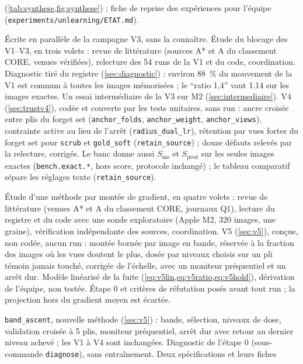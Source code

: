 \documentclass[11pt,a4paper]{article}
\newcommand{\code}[1]{\texttt{#1}}
\newcommand{\chemin}[1]{\nolinkurl{#1}}%
\begin{document}
\begin{description}[leftmargin=1.2em,font=\sffamily\bfseries\color{bleu}]
    (\cref{tab:synthese,fig:synthese}) ; fiche de reprise des expériences pour l'équipe
    (\chemin{experiments/unlearning/ETAT.md}).
  \item[22 novembre 2026, V4] Écrite en parallèle de la campagne V3, sans la connaître. Étude du
    blocage des V1--V3, en trois volets : revue de littérature (sources A* et A du classement CORE,
    venues vérifiées), relecture des 54 runs de la V1 et du code, coordination. Diagnostic tiré du
    registre (\cref{sec:diagnostic}) : environ \SI{88}{\percent} du mouvement de la V1 est commun à
    toutes les images mémorisées ; le \enquote{ratio 1,4} vaut \num{1.14} sur les images exactes. Un
    essai intermédiaire de la V3 sur M2 (\cref{sec:intermediaire}). V4 (\cref{sec:trustv4}), codée
    et couverte par les tests unitaires, sans run : ancre croisée entre plis du forget set
    (\code{anchor\_folds}, \code{anchor\_weight}, \code{anchor\_views}), contrainte active au lieu de
    l'arrêt (\code{radius\_dual\_lr}), rétention par vues fortes du forget set pour \code{scrub} et
    \code{gold\_soft} (\code{retain\_source}) ; douze défauts relevés par la relecture, corrigés. Le
    banc donne aussi $S_{\text{ms}}$ et $S_{\text{pred}}$ sur les seules images exactes
    (\code{bench.exact.*}, hors score, protocole inchangé) ; le tableau comparatif sépare les
    réglages texte (\code{retain\_source}).
  \item[22 novembre 2026, V5] Étude d'une méthode par montée de gradient, en quatre volets :
    revue de littérature (venues A* et A du classement CORE, journaux Q1), lecture du registre et du
    code avec une sonde exploratoire (Apple M2, 320 images, une graine), vérification indépendante
    des sources, coordination. V5 (\cref{sec:v5}), conçue, non codée, aucun run : montée bornée par
    image en bande, réservée à la fraction des images où les vues doutent le plus, dosée par niveaux
    choisis sur un pli témoin jamais touché, corrigée de l'échelle, avec un moniteur préquentiel et
    un arrêt dur. Modèle linéarisé de la fuite (\cref{eq:v5lin,eq:v5ratio,eq:v5hold}), dérivation
    de l'équipe, non testée. Étape 0 et critères de réfutation posés avant tout run ; la projection
    hors du gradient moyen est écartée.
  \item[22 novembre 2026, V5 codée] \code{band\_ascent}, nouvelle méthode (\cref{sec:v5}) : bande,
    sélection, niveaux de dose, validation croisée à 5 plis, moniteur préquentiel, arrêt dur avec
    retour au dernier niveau achevé ; les V1 à V4 sont inchangées. Diagnostic de l'étape 0
    (sous-commande \code{diagnose}), sans entraînement. Deux spécifications et leurs fiches

\end{description}
\end{document}
